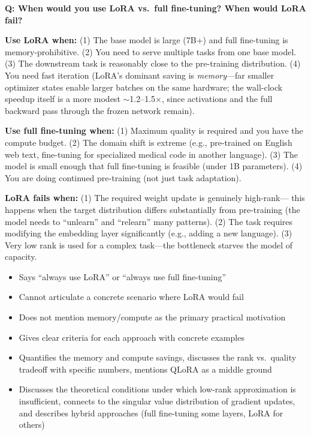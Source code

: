 \begin{interviewq}
\textbf{Q: When would you use LoRA vs.\ full fine-tuning? When would LoRA fail?}

 \quad {} \quad \badgefreq{\freqhigh}

\stronganswer
\textbf{Use LoRA when:} (1) The base model is large (7B+) and full fine-tuning
is memory-prohibitive. (2) You need to serve multiple tasks from one base model.
(3) The downstream task is reasonably close to the pre-training distribution.
(4) You need fast iteration (LoRA's dominant saving is \emph{memory}---far
smaller optimizer states enable larger batches on the same hardware; the
wall-clock speedup itself is a more modest $\sim$1.2--1.5$\times$, since
activations and the full backward pass through the frozen network remain).

\textbf{Use full fine-tuning when:} (1) Maximum quality is required and you have
the compute budget. (2) The domain shift is extreme (e.g., pre-trained on English
web text, fine-tuning for specialized medical code in another language). (3) The
model is small enough that full fine-tuning is feasible (under 1B parameters).
(4) You are doing continued pre-training (not just task adaptation).

\textbf{LoRA fails when:} (1) The required weight update is genuinely high-rank---
this happens when the target distribution differs substantially from pre-training
(the model needs to ``unlearn'' and ``relearn'' many patterns). (2) The task requires
modifying the embedding layer significantly (e.g., adding a new language). (3) Very
low rank is used for a complex task---the bottleneck starves the model of capacity.

\redflags
\begin{itemize}
    \item Says ``always use LoRA'' or ``always use full fine-tuning''
    \item Cannot articulate a concrete scenario where LoRA would fail
    \item Does not mention memory/compute as the primary practical motivation
\end{itemize}


\goodgreat
\begin{itemize}
    \item {} Gives clear criteria for each approach with concrete examples
    \item {} Quantifies the memory and compute savings, discusses the rank
          vs.\ quality tradeoff with specific numbers, mentions QLoRA as a middle ground
    \item {} Discusses the theoretical conditions under which low-rank
          approximation is insufficient, connects to the singular value distribution of
          gradient updates, and describes hybrid approaches (full fine-tuning some layers,
          LoRA for others)
\end{itemize}


\end{interviewq}
